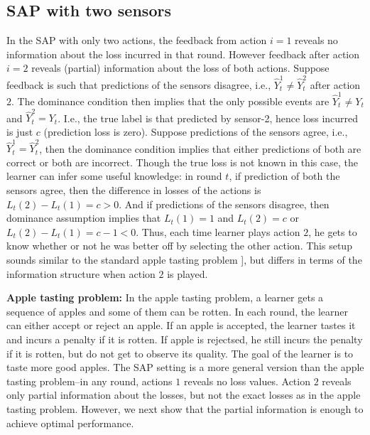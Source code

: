 \documentclass{article}
\begin{document}
\subsection{SAP with two sensors}
In the SAP with only two actions, the feedback from action $i=1$ reveals no information about the loss incurred in that round. However feedback after action $i=2$ reveals (partial) information about the loss of both actions. Suppose feedback is such that predictions of the sensors disagree, i.e., ${\hat{Y}^1_t\neq\hat{Y}^2_t}$ after action $2$.  The dominance condition then implies that the only possible events are $\hat{Y}^1_t \neq Y_t$ and $\hat{Y}^2_t=Y_t$. I.e., the true label is that predicted by sensor-2, hence loss incurred is just $c$ (prediction loss is zero). Suppose predictions of the sensors agree, i.e., ${\hat{Y}^1_t = \hat{Y}^2_t}$, then the dominance condition implies that either predictions of both are correct or both are incorrect. Though the true loss is not known in this case, the learner can infer some useful knowledge: in round $t$, if prediction of both the sensors agree, then the difference in losses of the actions is $L_t(2)-L_t(1)=c>0$. And if predictions of the sensors disagree, then dominance assumption implies that $L_t(1)=1$ and $L_t(2)=c$ or $L_t(2)-L_t(1)=c-1<0$. Thus, each time learner plays action $2$, he gets to know whether or not he was better off by selecting the other action. This setup sounds similar to the standard apple tasting problem \cite{IC2000_AppleTasting_HelmboldLittlestoneLong}
], but differs in terms of the information structure when action $2$ is played. 

\noindent
{\bf Apple tasting problem:} In the apple tasting problem, a learner gets a sequence of apples and some of them can be rotten. In each round, the learner can either accept or reject an apple. If an apple is accepted, the learner tastes it and incurs a penalty if it is rotten. If apple is rejectsed, he still incurs the penalty if it is rotten, but do not get to observe its quality. %
The goal of the learner is to taste more good apples. 
The SAP setting is a more general version than the apple tasting problem--in any round, actions $1$ reveals no loss values. Action $2$  reveals only partial information about the losses, but not the exact losses as in the apple tasting problem. However, we next show that the partial information is enough to achieve optimal performance.  
\end{document}
